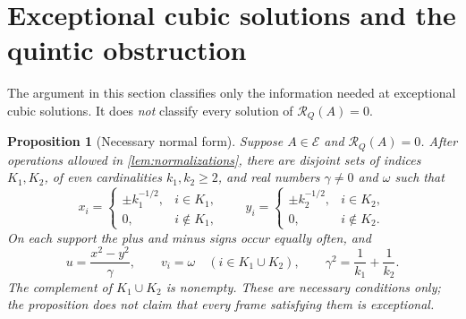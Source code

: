 \documentclass[11pt,reqno]{amsart}
\newtheorem{proposition}[proposition]{Proposition}
\theoremstyle{definition}
\theoremstyle{remark}
\numberwithin{equation}{section}
\newcommand{\Exc}{\mathcal E}
\begin{document}
\section{Exceptional cubic solutions and the quintic obstruction}
\label{sec:exceptional}

The argument in this section classifies only the information needed
at exceptional cubic solutions. It does \emph{not} classify every
solution of $\mathcal R_Q(A)=0$.

\begin{proposition}[Necessary normal form]\label{prop:normal-form}
Suppose $A\in\Exc$ and $\mathcal R_Q(A)=0$. After operations allowed
in \cref{lem:normalizations}, there are disjoint sets of indices
$K_1,K_2$, of even cardinalities $k_1,k_2\geq2$, and real numbers
$\gamma\ne0$ and $\omega$ such that
\begin{equation}\label{eq:normal-supports}
 x_i=\begin{cases}\pm k_1^{-1/2},&i\in K_1,\\0,&i\notin K_1,
       \end{cases}
 \qquad
 y_i=\begin{cases}\pm k_2^{-1/2},&i\in K_2,\\0,&i\notin K_2.
       \end{cases}
\end{equation}
On each support the plus and minus signs occur equally often, and
\begin{equation}\label{eq:normal-uv}
 u=\frac{x^2-y^2}{\gamma},\qquad
 v_i=\omega\quad(i\in K_1\cup K_2),\qquad
 \gamma^2=\frac1{k_1}+\frac1{k_2}.
\end{equation}
The complement of $K_1\cup K_2$ is nonempty. These are necessary
conditions only; the proposition does not claim that every frame
satisfying them is exceptional.
\end{proposition}
\end{document}
